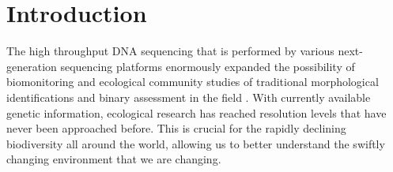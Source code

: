 \documentclass[11pt, a4paper]{article}
\begin{document}

\section{Introduction}
The high throughput DNA sequencing that is performed by various next-generation sequencing platforms \cite{Shendure2008}  enormously expanded the possibility of biomonitoring and ecological community studies of traditional morphological identifications and binary assessment in the field \cite{Baird2012}.  With currently available genetic information, ecological research has reached resolution levels that have never been approached before. This is crucial for the rapidly declining biodiversity all around the world, allowing us to better understand the swiftly changing environment that we are changing.\cite{Hardulak2020,THOMSEN20154} 
\end{document}
